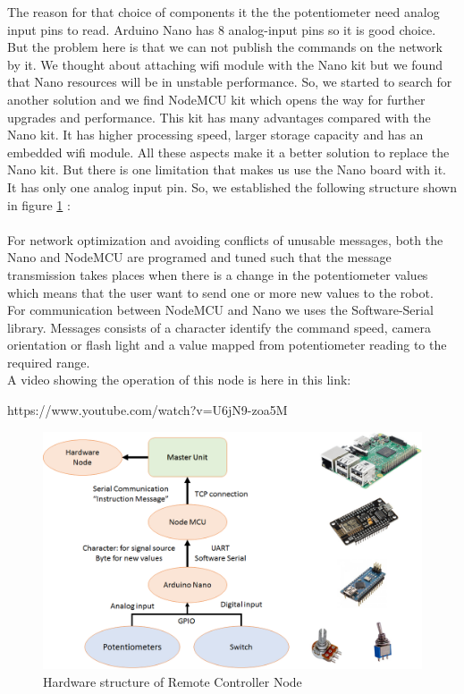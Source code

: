 \documentclass[12pt]{article}
\begin{document}
	\noindent The reason for that choice of components it the the potentiometer need analog input pins to read. Arduino Nano has 8 analog-input pins so it is good choice. But the problem here is that we can not publish the commands on the network by it. We thought about attaching wifi module with the Nano kit but we found that Nano resources will be in unstable performance.
	So, we started to search for another solution and we find NodeMCU kit which opens the way for further upgrades and performance. This kit has many advantages compared with the Nano kit. It has higher processing speed, larger storage capacity and has an embedded wifi module. All these aspects make it a better solution to replace the Nano kit. But there is one limitation that makes us use the Nano board with it. It has only one analog input pin. So, we established the following structure shown in figure \ref{fig:man-controller} :\\ \\
	
	For network optimization and avoiding conflicts of unusable messages, both the Nano and NodeMCU are programed and tuned such that the message transmission takes places when there is a change in the potentiometer values which means that the user want to send one or more new values to the robot. \\
	For communication between NodeMCU and Nano we uses the Software-Serial library. Messages consists of a character identify the command speed, camera orientation or flash light and a value mapped from potentiometer reading to the required range.\\
	A video showing the operation of this node is here in this link:
	\begin{center}
 		https://www.youtube.com/watch?v=U6jN9-zoa5M
	\end{center}
	\begin{figure}[H]
		\centering
		\includegraphics[width =1\textwidth]{Fig/man-controller.png}
		\caption{Hardware structure of Remote Controller Node}
		\label{fig:man-controller}
	\end{figure}
\end{document}

